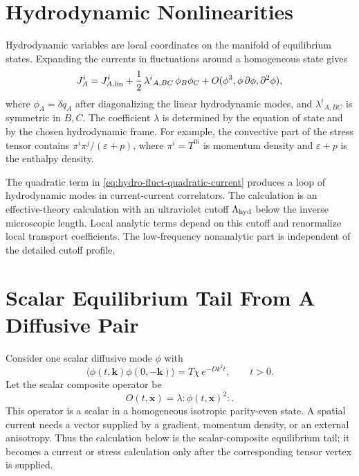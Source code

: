 \section{Hydrodynamic Nonlinearities}

Hydrodynamic variables are local coordinates on the manifold of equilibrium
states.  Expanding the currents in fluctuations around a homogeneous state
gives
\begin{equation}
  J^i_A
  =
  J^i_{A,\rm lin}
  +\frac12\,\lambda^i{}_{A,BC}\,\phi_B\phi_C
  +O(\phi^3,\phi\,\partial\phi,\partial^2\phi),
  \label{eq:hydro-fluct-quadratic-current}
\end{equation}
where \(\phi_A=\delta q_A\) after diagonalizing the linear hydrodynamic
modes, and \(\lambda^i{}_{A,BC}\) is symmetric in \(B,C\).  The coefficient
\(\lambda\) is determined by the equation of state and by the chosen
hydrodynamic frame.  For example, the convective part of the stress tensor
contains \(\pi^i\pi^j/(\varepsilon+p)\), where \(\pi^i=T^{0i}\) is momentum
density and \(\varepsilon+p\) is the enthalpy density.

The quadratic term in \eqref{eq:hydro-fluct-quadratic-current} produces a
loop of hydrodynamic modes in current-current correlators.  The calculation
is an effective-theory calculation with an ultraviolet cutoff
\(\Lambda_{\rm hyd}\) below the inverse microscopic length.  Local analytic
terms depend on this cutoff and renormalize local transport coefficients.
The low-frequency nonanalytic part is independent of the detailed cutoff
profile.

\section{Scalar Equilibrium Tail From A Diffusive Pair}

Consider one scalar diffusive mode \(\phi\) with
\[
  \langle\phi(t,\mathbf k)\phi(0,-\mathbf k)\rangle
  =
  T\chi\,e^{-Dk^2t},
  \qquad t>0.
\]
Let the scalar composite operator be
\[
  O(t,\mathbf x)=\lambda:\!\phi(t,\mathbf x)^2\!: .
\]
This operator is a scalar in a homogeneous isotropic parity-even state.  A
spatial current needs a vector supplied by a gradient, momentum density, or an
external anisotropy.  Thus the calculation below is the scalar-composite
equilibrium tail; it becomes a current or stress calculation only after the
corresponding tensor vertex is supplied.

